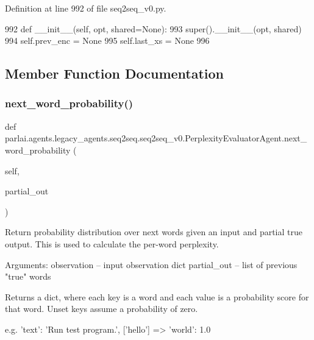 Definition at line 992 of file seq2seq\+\_\+v0.\+py.


\begin{DoxyCode}
992     \textcolor{keyword}{def }\_\_init\_\_(self, opt, shared=None):
993         super().\_\_init\_\_(opt, shared)
994         self.prev\_enc = \textcolor{keywordtype}{None}
995         self.last\_xs = \textcolor{keywordtype}{None}
996 
\end{DoxyCode}


\subsection{Member Function Documentation}
\mbox{\label{classparlai_1_1agents_1_1legacy__agents_1_1seq2seq_1_1seq2seq__v0_1_1PerplexityEvaluatorAgent_ab6f67e52990f7cafdb7fbd2f6215e968}} 
\subsubsection{\texorpdfstring{next\+\_\+word\+\_\+probability()}{next\_word\_probability()}}
{\footnotesize\ttfamily def parlai.\+agents.\+legacy\+\_\+agents.\+seq2seq.\+seq2seq\+\_\+v0.\+Perplexity\+Evaluator\+Agent.\+next\+\_\+word\+\_\+probability (\begin{DoxyParamCaption}\item[{}]{self,  }\item[{}]{partial\+\_\+out }\end{DoxyParamCaption})}

\begin{DoxyVerb}Return probability distribution over next words given an input and partial true
output. This is used to calculate the per-word perplexity.

Arguments:
observation -- input observation dict
partial_out -- list of previous "true" words

Returns a dict, where each key is a word and each value is a probability
score for that word. Unset keys assume a probability of zero.

e.g.
{'text': 'Run test program.'}, ['hello'] => {'world': 1.0}
\end{DoxyVerb}
 

